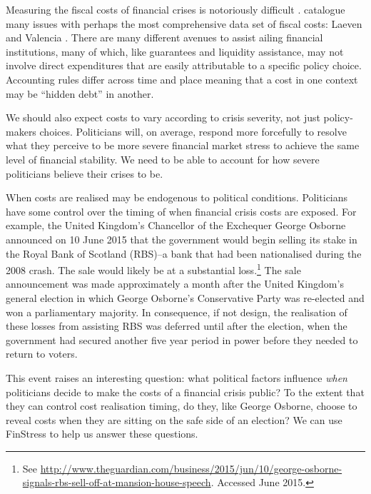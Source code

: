 \documentclass[]{article}
\begin{document}
Measuring the fiscal costs of financial crises is notoriously difficult \citep[see][]{reinhartRogoff2011}. \cite{GandrudHallerberg2015} catalogue many issues with perhaps the most comprehensive data set of fiscal costs: Laeven and Valencia \citeyearpar[and their predecessors]{laeven2013}. There are many different avenues to assist ailing financial institutions, many of which, like guarantees and liquidity assistance, may not involve direct expenditures that are easily attributable to a specific policy choice. Accounting rules differ across time and place \citep{gandrudHallerbergWEP} meaning that a cost in one context may be ``hidden debt'' \citep{reinhartRogoff2011} in another.

We should also expect costs to vary according to crisis severity, not just policy-makers choices. Politicians will, on average, respond more forcefully to resolve what they perceive to be more severe financial market stress to achieve the same level of financial stability. We need to be able to account for how severe politicians believe their crises to be.

When costs are realised may be endogenous to political conditions. Politicians have some control over the timing of when financial crisis costs are exposed. For example, the United Kingdom's Chancellor of the Exchequer George Osborne announced on 10 June 2015 that the government would begin selling its stake in the Royal Bank of Scotland (RBS)--a bank that had been nationalised during the 2008 crash. The sale would likely be at a substantial loss.\footnote{See \url{http://www.theguardian.com/business/2015/jun/10/george-osborne-signals-rbs-sell-off-at-mansion-house-speech}. Accessed June 2015.} The sale announcement was made approximately a month after the United Kingdom's general election in which George Osborne's Conservative Party was re-elected and won a parliamentary majority. In consequence, if not design, the realisation of these losses from assisting RBS was deferred until after the election, when the government had secured another five year period in power before they needed to return to voters.

This event raises an interesting question: what political factors influence \emph{when} politicians decide to make the costs of a financial crisis public? To the extent that they can control cost realisation timing, do they, like George Osborne, choose to reveal costs when they are sitting on the safe side of an election? We can use FinStress to help us answer these questions.
\end{document}
